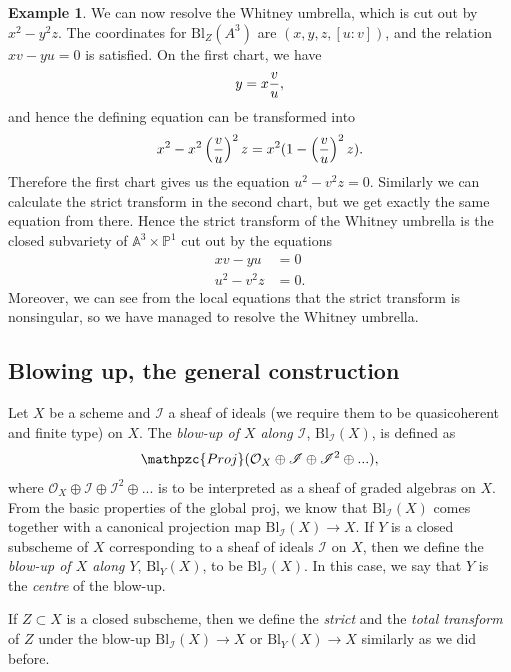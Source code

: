 \documentclass[12pt,a4paper,leqno]{article}
\newcommand{\Aff}{\mathbb{A}}
\newcommand{\Proj}{\mathbb{P}}
\newcommand{\OO}{\mathcal{O}}
\newcommand{\bl}{\mathrm{Bl}}
\newcommand{\rproj}{\mathpzc{Proj}}
\theoremstyle{plain}
\theoremstyle{definition}
\newtheorem{ex}[theo]{Example}
\theoremstyle{remark}
\begin{document}
\begin{ex}
We can now resolve the Whitney umbrella, which is cut out by $x^2 - y^2 z$. The coordinates for $\bl_Z (A^3)$ are $(x,y,z,[u:v])$, and the relation $xv-yu = 0$ is satisfied. On the first chart, we have 
\begin{equation*}
y = x {v \over u},
\end{equation*} 
and hence the defining equation can be transformed into
\begin{equation*}
x^2 -  x^2\left( {v \over u} \right)^2 z = x^2 ( 1 - \left( {v \over u} \right)^2 z ).
\end{equation*}
Therefore the first chart gives us the equation $u^2 - v^2 z = 0$. Similarly we can calculate the strict transform in the second chart, but we get exactly the same equation from there. Hence the strict transform of the Whitney umbrella is the closed subvariety of $\Aff^3 \times \Proj^1$ cut out by the equations
\begin{align*}
xv-yu &= 0\\
u^2 - v^2 z &= 0.
\end{align*}
Moreover, we can see from the local equations that the strict transform is nonsingular, so we have managed to resolve the Whitney umbrella.
\end{ex}

\subsection{Blowing up, the general construction}

Let $X$ be a scheme and $\mathscr{I}$ a sheaf of ideals (we require them to be quasicoherent and finite type) on $X$. The \emph{blow-up of $X$ along $\mathscr{I}$}, $\bl_{\mathscr{I}} (X)$, is defined as 
\begin{equation*}
\rproj ( \OO_X \oplus \mathscr{I} \oplus \mathscr{I}^2 \oplus ...),
\end{equation*}
where $\OO_X \oplus \mathscr{I} \oplus \mathscr{I}^2 \oplus ...$ is to be interpreted as a sheaf of graded algebras on $X$. From the basic properties of the global proj, we know that $\bl_\mathscr{I} (X)$ comes together with a canonical projection map $\bl_\mathscr{I}(X) \to X$. If $Y$ is a closed subscheme of $X$ corresponding to a sheaf of ideals $\mathscr{I}$ on $X$, then we define the \emph{blow-up of $X$ along $Y$}, $\bl_Y (X)$, to be $\bl_\mathscr{I} (X)$. In this case, we say that $Y$ is the \emph{centre} of the blow-up.

If $Z \subset X$ is a closed subscheme, then we define the \emph{strict} and the \emph{total transform} of $Z$ under the blow-up $\bl_\mathscr{I}(X) \to X$ or $\bl_Y(X) \to X$ similarly as we did before. 
\end{document}
